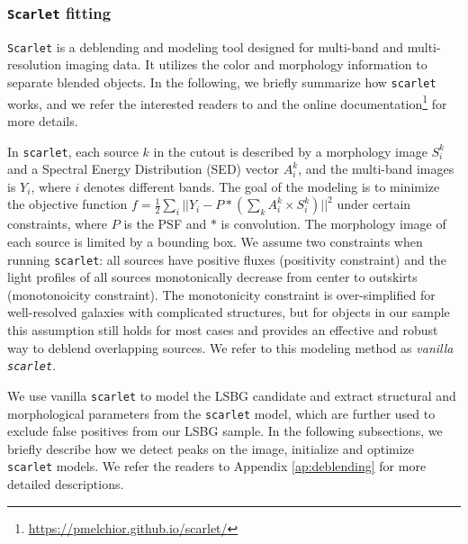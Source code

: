 \documentclass[twocolumn,astrosymb,twocolappendix]{aastex631}
\newcommand{\code}[1]{\texttt{#1}}
\begin{document}
\begin{CJK*}{UTF8}{gbsn}
\subsubsection{\code{Scarlet} fitting}
\code{Scarlet} is a deblending and modeling tool designed for multi-band and multi-resolution imaging data. It utilizes the color and morphology information to separate blended objects. In the following, we briefly summarize how \code{scarlet} works, and we refer the interested readers to \citet{Melchior2018,Melchior2021} and the online documentation\footnote{\url{https://pmelchior.github.io/scarlet/}} for more details. 

In \code{scarlet}, each source $k$ in the cutout is described by a morphology image $S^k_i$ and a Spectral Energy Distribution (SED) vector $A^k_i$, and the multi-band images is $Y_i$, where $i$ denotes different bands. The goal of the modeling is to minimize the objective function $f = \frac{1}{2}\sum_i ||Y_i - P \ast (\sum_k A^k_i\times S^k_i)||^{2}$ under certain constraints, where $P$ is the PSF and $*$ is convolution. The morphology image of each source is limited by a bounding box. We assume two constraints when running \code{scarlet}: all sources have positive fluxes (positivity constraint) and the light profiles of all sources monotonically decrease from center to outskirts (monotonoicity constraint). The monotonicity constraint is over-simplified for well-resolved galaxies with complicated structures, but for objects in our sample this assumption still holds for most cases and provides an effective and robust way to deblend overlapping sources. We refer to this modeling method as \textit{vanilla \code{scarlet}}. 


We use vanilla \code{scarlet} to model the LSBG candidate and extract structural and morphological parameters from the \code{scarlet} model, which are further used to exclude false positives from our LSBG sample. In the following subsections, we briefly describe how we detect peaks on the image, initialize and optimize \code{scarlet} models. We refer the readers to Appendix \ref{ap:deblending} for more detailed descriptions. 


\end{CJK*}
\end{document}
